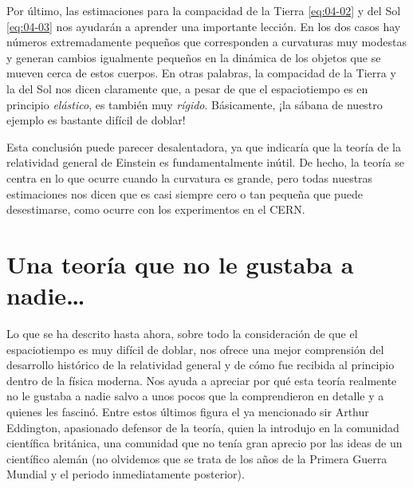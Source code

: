 Por último, las estimaciones para la compacidad de la Tierra \eqref{eq:04-02} y del
Sol \eqref{eq:04-03} nos ayudarán a aprender una importante lección. En los dos
casos hay números extremadamente pequeños que corresponden a curvaturas muy
modestas y generan cambios igualmente pequeños en la dinámica de los objetos que
se mueven cerca de estos cuerpos. En otras palabras, la compacidad de la Tierra y
la del Sol nos dicen claramente que, a pesar de que el espaciotiempo es en
principio \emph{elástico}, es también muy \emph{rígido}. Básicamente, ¡la sábana de
nuestro ejemplo es bastante difícil de doblar!

Esta conclusión puede parecer desalentadora, ya que indicaría que la teoría de la
relatividad general de Einstein es fundamentalmente inútil. De hecho, la teoría se
centra en lo que ocurre cuando la curvatura es grande, pero todas nuestras
estimaciones nos dicen que es casi siempre cero o tan pequeña que puede
desestimarse, como ocurre con los experimentos en el CERN.

\section{Una teoría que no le gustaba a nadie…}\label{sec:04-history}

Lo que se ha descrito hasta ahora, sobre todo la consideración de que el
espaciotiempo es muy difícil de doblar, nos ofrece una mejor comprensión del
desarrollo histórico de la relatividad general y de
cómo fue recibida al principio dentro de la física moderna. Nos ayuda a apreciar
por qué esta teoría realmente no le gustaba a nadie salvo a unos pocos que la
comprendieron en detalle y a quienes les fascinó. Entre estos últimos figura el
ya mencionado sir Arthur Eddington, apasionado defensor
de la teoría, quien la introdujo en la comunidad científica británica, una
comunidad que no tenía gran aprecio por las ideas de un científico alemán (no
olvidemos que se trata de los años de la Primera Guerra Mundial y el periodo
inmediatamente posterior).

